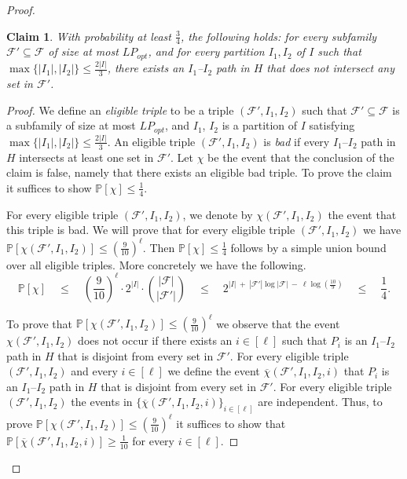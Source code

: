 \documentclass[11pt]{amsart}
\newtheorem{claim}{Claim}[theorem]
\newcommand{\cal}{\mathcal}
\newcommand{\lpopt}{LP_{opt}}
\begin{document}
\begin{proof}
    
    \begin{claim}\label{claim:no_balanced_separator}
        With probability at least $\frac{3}{4}$, the following holds: for every subfamily $\mathcal{F}' \subseteq \mathcal{F}$ of size at most $\lpopt$, and for every partition $I_1, I_2$ of $I$ such that $\max\{|I_1|, |I_2|\} \leq \frac{2|I|}{3}$, there exists an $I_1$--$I_2$ path in $H$ that does not intersect any set in $\mathcal{F}'$. 
    \end{claim}

    \begin{proof}
        We define an {\em eligible triple} to be a triple $(\mathcal{F}', I_1, I_2)$ such that $\mathcal{F}' \subseteq \mathcal{F}$ is a subfamily of size at most $\lpopt$, and $I_1$, $I_2$ is a partition of $I$ satisfying $\max\{|I_1|, |I_2|\} \leq \frac{2|I|}{3}$. An eligible triple $(\mathcal{F}', I_1, I_2)$ is {\em bad} if every $I_1$--$I_2$ path in $H$ intersects at least one set in $\mathcal{F}'$. Let $\chi$ be the event that the conclusion of the claim is false, namely that there exists an eligible bad triple. To prove the claim it suffices to show $\mathbb{P}[\chi] \leq \frac{1}{4}$.
        
        For every eligible triple  $(\mathcal{F}', I_1, I_2)$, we denote by $\chi({\cal F}', I_1, I_2)$ the event that this triple is bad. We will prove that for every eligible triple $(\mathcal{F}', I_1, I_2)$ we have $\mathbb{P}[\chi({\cal F}', I_1, I_2)] \leq (\frac{9}{10})^\ell$. Then $\mathbb{P}[\chi] \leq \frac{1}{4}$ follows by a simple union bound over all eligible triples. More concretely we have the following.
        $$
            \mathbb{P}\left[\chi\right] \quad \leq \quad \left(\frac{9}{10}\right)^{\ell} \cdot 2^{|I|} \cdot \binom{|\mathcal{F}|}{|\mathcal{F}'|} \quad
            \leq \quad 2^{|I|\ +\ |\mathcal{F}'| \log |\mathcal{F}|\ -\ \ell \log\left(\frac{10}{9}\right)} \quad
            \leq \quad \frac{1}{4}.
        $$
        
        To prove that $\mathbb{P}[\chi({\cal F}', I_1, I_2)] \leq (\frac{9}{10})^\ell$ we observe that the event $\chi({\cal F}', I_1, I_2)$ does not occur if there exists an $i \in [\ell]$ such that $P_i$ is an $I_1$--$I_2$ path in $H$ that is disjoint from every set in $\mathcal{F}'$. For every eligible triple $(\mathcal{F}', I_1, I_2)$ and every $i \in [\ell]$ we define the event $\overline{\chi}({\cal F}', I_1, I_2, i)$ that $P_i$ is an $I_1$--$I_2$ path in $H$ that is disjoint from every set in $\mathcal{F}'$. For every eligible triple $({\cal F}', I_1, I_2)$ the events in $\{\overline{\chi}({\cal F}', I_1, I_2, i)\}_{i \in [\ell]}$ are independent. Thus, to prove  $\mathbb{P}[\chi({\cal F}', I_1, I_2)] \leq (\frac{9}{10})^\ell$ it suffices to show that $\mathbb{P}[\overline{\chi}({\cal F}', I_1, I_2, i)] \geq \frac{1}{10}$ for every $i \in [\ell]$.
        

\end{proof}
\end{proof}
\end{document}
